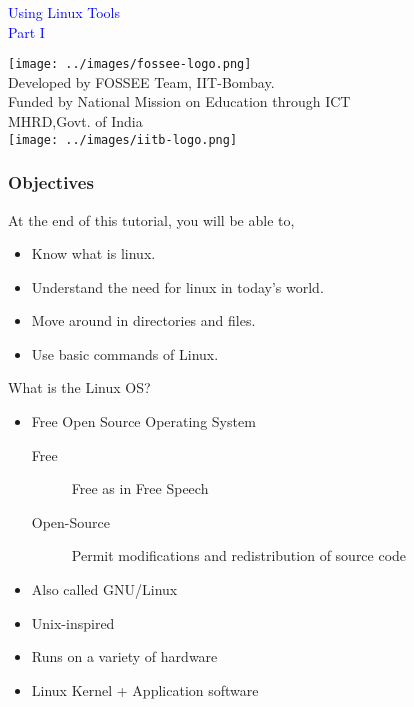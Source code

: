 \documentclass[12pt,compress]{beamer}
\begin{document}
\begin{frame}

\begin{center}
\vspace{12pt}
\textcolor{blue}{\huge Using Linux Tools\\Part I}
\end{center}
\vspace{18pt}
\begin{center}
\vspace{10pt}
\texttt{[image: ../images/fossee-logo.png]}\\
\vspace{5pt}
\scriptsize Developed by FOSSEE Team, IIT-Bombay. \\ 
\scriptsize Funded by National Mission on Education through ICT\\
\scriptsize  MHRD,Govt. of India\\
\texttt{[image: ../images/iitb-logo.png]}\\
\end{center}
\end{frame}

\begin{frame}
\frametitle{Objectives}
\label{sec-2}

At the end of this tutorial, you will be able to,
\begin{itemize}
\item Know what is linux.
\item  Understand the need for linux in today's world.
\item Move around in directories and files.
\item Use basic commands of Linux.
\end{itemize}
\end{frame}

\begin{frame}[fragile]
  \begin{block}{What is the Linux OS?}
    \begin{itemize}
    \item Free Open Source Operating System
      \begin{description}
        \item[Free] 
          Free as in Free Speech
        \item[Open-Source]
          Permit modifications and redistribution of source code
      \end{description}
    \item Also called GNU/Linux 
    \item Unix-inspired
    \item Runs on a variety of hardware
    \item Linux Kernel + Application software
    \end{itemize}
  \end{block}
\end{frame}
\end{document}
